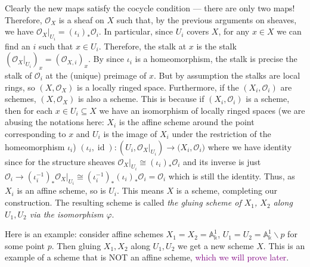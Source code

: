 \documentclass[12pt,letter]{article}
\newcommand{\id}[0]{\operatorname{id}}
\begin{document}
	Clearly the new maps satisfy the cocycle condition --- there are only two maps! Therefore, $\mathscr O_X$ is a sheaf on $X$ such that, by the previous arguments on sheaves, we have $\mathscr O_X|_{U_i}=\left(\iota_{i}\right)_*\mathscr O_i$. In particular, since $U_i$ covers $X$,  for any $x\in X$ we can find an $i$ such that $x\in U_i$. Therefore, the stalk at $x$ is the stalk $\left(\mathscr O_X|_{U_i}\right)_x=\left(\mathscr O_{X, i}\right)_x$. By since $\iota_i$ is a homeomorphism, the stalk is precise the stalk of $\mathscr O_i$ at the (unique) preimage of $x$. But by assumption the stalks are local rings, so $(X,\mathscr O_X)$ is a locally ringed space. Furthermore, if the $(X_i, \mathscr O_i)$ are schemes, $(X, \mathscr O_X)$ is also a scheme. This is because if $(X_i, \mathscr O_i)$ is a scheme, then for each $x\in U_i\subseteq X$ we have an isomorphism of locally ringed spaces (we are abusing the notations here: $X_i$ is the affine scheme around the point corresponding to $x$ and $U_i$ is the image of $X_i$ under the restriction of the homeomorphism $\iota_i$) $(\iota_i, \id):(U_i, \mathscr O_X|_{U_i})\to\mathscr (X_i, \mathscr O_i)$ where we have identity since for the structure sheaves $\mathscr O_X|_{U_i}\cong (\iota_i)_*\mathscr O_i$ and its inverse is just $\mathscr O_i\to (\iota_i^{-1})_*\mathscr O_X|_{U_i}\cong(\iota_i^{-1})_*(\iota_i)_*\mathscr O_i=\mathscr O_i$ which is still the identity. Thus, as $X_i$ is an affine scheme, so is $U_i$. This means $X$ is a scheme, completing our construction. The resulting scheme is called \textit{the gluing scheme of $X_1$, $X_2$ along $U_1, U_2$ via the isomorphism $\varphi$}.

	Here is an example: consider affine schemes $X_1=X_2=\mathbb{A}_{\mathbb k}^1$, $U_1=U_2=\mathbb{A}_{\mathbb k}^1\backslash p$ for some point $p$. Then gluing $X_1, X_2$ along $U_1, U_2$ we get a new scheme $X$. This is an example of a scheme that is NOT an affine scheme, \textcolor{purple}{which we will prove later}.
\end{document}
